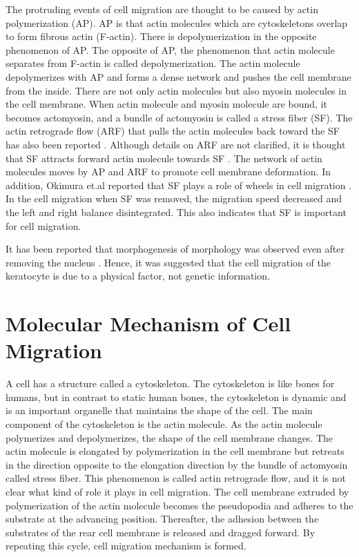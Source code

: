 \documentclass[a4paper,12pt, oneside]{book}
\begin{document}
The protruding events of cell migration are thought to be caused by actin polymerization (AP)\cite{svitkina1997analysis}.
AP is that actin molecules which are cytoskeletons overlap to form fibrous actin (F-actin).
There is depolymerization in the opposite phenomenon of AP.
The opposite of AP, the phenomenon that actin molecule separates from F-actin is called depolymerization.
The actin molecule depolymerizes with AP and forms a dense network and pushes the cell membrane from the inside.
There are not only actin molecules but also myosin molecules in the cell membrane.
When actin molecule and myosin molecule are bound, it becomes actomyosin, and a bundle of actomyosin is called a stress fiber (SF).
The actin retrograde flow (ARF) that pulls the actin molecules back toward the SF has also been reported \cite{swaminathan2017actin}.
Although details on ARF are not clarified, it is thought that SF attracts forward actin molecule towards SF \cite{nakata2016role}.
The network of actin molecules moves by AP and ARF to promote cell membrane deformation.
In addition, Okimura et.al reported that SF plays a role of wheels in cell migration \cite{okimura2018rotation}.
In the cell migration when SF was removed, the migration speed decreased and the left and right balance disintegrated.
This also indicates that SF is important for cell migration.

It has been reported that morphogenesis of morphology was observed even after removing the nucleus \cite{asano2004keratocyte}.
Hence, it was suggested that the cell migration of the keratocyte is due to a physical factor, not genetic information.


\section{Molecular Mechanism of Cell Migration}
A cell has a structure called a cytoskeleton. The cytoskeleton is like bones for humans, but in contrast to static human bones, the cytoskeleton is dynamic and is an important organelle that maintains the shape of the cell. The main component of the cytoskeleton is the actin molecule. As the actin molecule polymerizes and depolymerizes, the shape of the cell membrane changes. The actin molecule is elongated by polymerization in the cell membrane but retreats in the direction opposite to the elongation direction by the bundle of actomyosin called stress fiber. This phenomenon is called actin retrograde flow, and it is not clear what kind of role it plays in cell migration. The cell membrane extruded by polymerization of the actin molecule becomes the pseudopodia and adheres to the substrate at the advancing position. Thereafter, the adhesion between the substrates of the rear cell membrane is released and dragged forward. By repeating this cycle, cell migration mechanism is formed.
\end{document}
